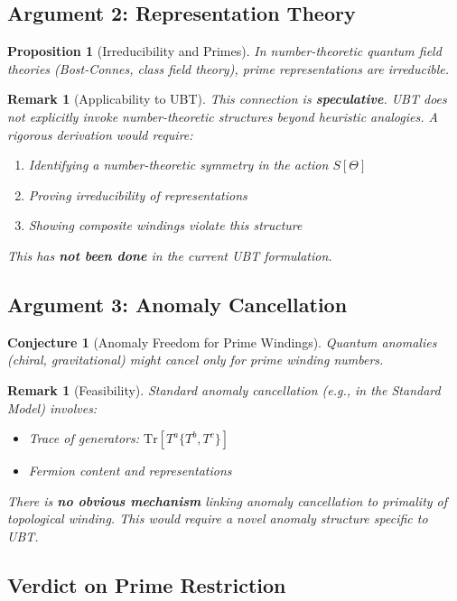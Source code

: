 \documentclass[12pt]{article}
\newtheorem{proposition}[definition]{Proposition}
\newtheorem{remark}[definition]{Remark}
\newtheorem{conjecture}{Conjecture}[section]
\newcommand{\Tr}{\mathrm{Tr}}
\begin{document}
\subsection{Argument 2: Representation Theory}

\begin{proposition}[Irreducibility and Primes]
In number-theoretic quantum field theories (Bost-Connes, class field theory), prime representations are irreducible.
\end{proposition}

\begin{remark}[Applicability to UBT]
This connection is \textbf{speculative}. UBT does not explicitly invoke number-theoretic structures beyond heuristic analogies. A rigorous derivation would require:
\begin{enumerate}
    \item Identifying a number-theoretic symmetry in the action $S[\Theta]$
    \item Proving irreducibility of representations
    \item Showing composite windings violate this structure
\end{enumerate}
This has \textbf{not been done} in the current UBT formulation.
\end{remark}

\subsection{Argument 3: Anomaly Cancellation}

\begin{conjecture}[Anomaly Freedom for Prime Windings]
Quantum anomalies (chiral, gravitational) might cancel only for prime winding numbers.
\end{conjecture}

\begin{remark}[Feasibility]
Standard anomaly cancellation (e.g., in the Standard Model) involves:
\begin{itemize}
    \item Trace of generators: $\Tr[T^a\{T^b, T^c\}]$
    \item Fermion content and representations
\end{itemize}
There is \textbf{no obvious mechanism} linking anomaly cancellation to primality of topological winding. This would require a novel anomaly structure specific to UBT.
\end{remark}

\subsection{Verdict on Prime Restriction}
\end{document}
